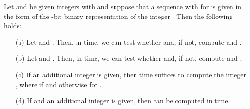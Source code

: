 \documentclass[envcountsame,envcountsect,undated,nolinenumbers]{lnthi}
\begin{document}
\begin{lemma}
\label{lem:word}Let  and  be given integers
with  and suppose that a
sequence  with
 for 
is given
in the form of the -bit binary representation
of the integer
.
Then the following holds:
\begin{itemize}
\item[(a)]
Let  and .
Then, in  time,
we can test whether  and, if not,
compute  and .
\item[(b)]
Let  and .
Then, in  time,
we can test whether  and, if not,
compute  and .
\item[(c)]
If an additional integer 
is given, then  time
suffices to compute the integer
, where
 if  and  otherwise
for .
\item[(d)]
If  and
an additional integer 
is given, then 
can be computed
in  time.
\end{itemize}
\end{lemma}
\end{document}
